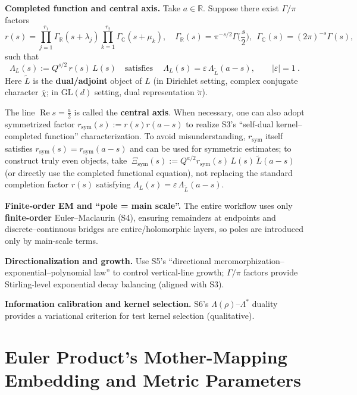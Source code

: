 \documentclass[11pt,a4paper]{article}
\theoremstyle{remark}
\DeclareMathOperator{\Re}{Re}
\begin{document}
\textbf{Completed function and central axis.} Take $a\in\mathbb{R}$. Suppose there exist $\Gamma/\pi$ factors
\begin{equation}
r(s)=\prod_{j=1}^{r_1}\Gamma_{\mathbb{R}}(s+\lambda_j)\prod_{k=1}^{r_2}\Gamma_{\mathbb{C}}(s+\mu_k),
\quad
\Gamma_{\mathbb{R}}(s)=\pi^{-s/2}\Gamma\!\Big(\frac{s}{2}\Big),\ \
\Gamma_{\mathbb{C}}(s)=(2\pi)^{-s}\Gamma(s),
\end{equation}
such that
\begin{equation}
\Lambda_{L}(s):=Q^{s/2}\,r(s)\,L(s)\quad\text{satisfies}\quad
\boxed{\ \Lambda_{L}(s)=\varepsilon\,\Lambda_{\tilde{L}}(a-s),\qquad |\varepsilon|=1\ }.
\end{equation}
Here $\tilde{L}$ is the \textbf{dual/adjoint} object of $L$ (in Dirichlet setting, complex conjugate character $\bar{\chi}$; in $\mathrm{GL}(d)$ setting, dual representation $\tilde{\pi}$).

The line $\Re s=\frac{a}{2}$ is called the \textbf{central axis}. When necessary, one can also adopt symmetrized factor $r_{\mathrm{sym}}(s):=r(s)r(a-s)$ to realize S3's ``self-dual kernel--completed function'' characterization. To avoid misunderstanding, $r_{\mathrm{sym}}$ itself satisfies $r_{\mathrm{sym}}(s)=r_{\mathrm{sym}}(a-s)$ and can be used for symmetric estimates; to construct truly even objects, take $\boxed{\ \Xi_{\mathrm{sym}}(s):=Q^{a/2}r_{\mathrm{sym}}(s)\,L(s)\,\tilde{L}(a-s)\ }$ (or directly use the completed functional equation), not replacing the standard completion factor $r(s)$ satisfying $\Lambda_{L}(s)=\varepsilon\,\Lambda_{\tilde{L}}(a-s)$.

\textbf{Finite-order EM and ``pole = main scale''.} The entire workflow uses only \textbf{finite-order} Euler--Maclaurin (S4), ensuring remainders at endpoints and discrete--continuous bridges are entire/holomorphic layers, so poles are introduced only by main-scale terms.

\textbf{Directionalization and growth.} Use S5's ``directional meromorphization--exponential--polynomial law'' to control vertical-line growth; $\Gamma/\pi$ factors provide Stirling-level exponential decay balancing (aligned with S3).

\textbf{Information calibration and kernel selection.} S6's $\Lambda(\rho)$--$\Lambda^\ast$ duality provides a variational criterion for test kernel selection (qualitative).

\section{Euler Product's Mother-Mapping Embedding and Metric Parameters}
\end{document}
